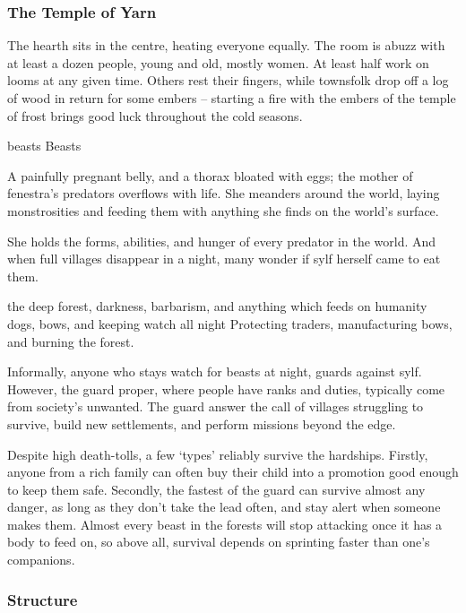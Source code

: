 \begin{multicols}{2}
\subsubsection{The Temple of Yarn}

The hearth sits in the centre, heating everyone equally.
The room is abuzz with at least a dozen people, young and old, mostly women.
At least half work on looms at any given time.
Others rest their fingers, while townsfolk drop off a log of wood in return for some embers -- starting a fire with the embers of the temple of frost brings good luck throughout the cold seasons.


  {\gls{beasts}}%
  {Beasts}%
  {%
    A painfully pregnant belly, and a thorax bloated with eggs; the mother of \gls{fenestra}'s predators overflows with life.
    She meanders around the world, laying monstrosities and feeding them with anything she finds on the world's surface.

    She holds the forms, abilities, and hunger of every predator in the world.
    And when full \glspl{village} disappear in a night, many wonder if \gls{sylf} herself came to eat them.
  }%
  {the deep forest, darkness, barbarism, and anything which feeds on humanity}%
  {dogs, bows, and keeping watch all night}%
  {}%
  {
    Protecting traders, manufacturing bows, and burning the forest.
  }%

Informally, anyone who stays watch for beasts at night, guards against \gls{sylf}.
However, the \gls{guard} proper, where people have ranks and duties, typically come from society's unwanted.
The \gls{guard} answer the call of \glspl{village} struggling to survive, build new settlements, and perform missions beyond the \gls{edge}.

Despite high death-tolls, a few `types' reliably survive the hardships.
Firstly, anyone from a rich family can often buy their child into a promotion good enough to keep them safe.
Secondly, the fastest of the \gls{guard} can survive almost any danger, as long as they don't take the lead often, and stay alert when someone makes them.
Almost every beast in the forests will stop attacking once it has a body to feed on, so above all, survival depends on sprinting faster than one's companions.

\subsubsection{Structure}


\end{multicols}
